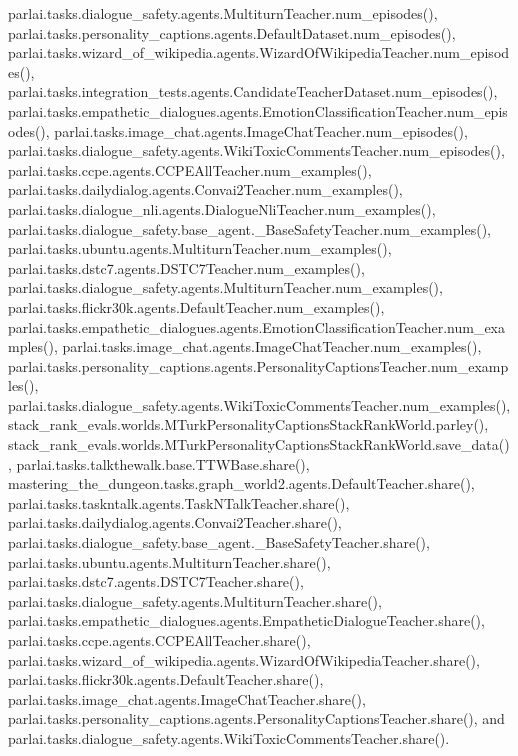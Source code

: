 parlai.\+tasks.\+dialogue\+\_\+safety.\+agents.\+Multiturn\+Teacher.\+num\+\_\+episodes(), parlai.\+tasks.\+personality\+\_\+captions.\+agents.\+Default\+Dataset.\+num\+\_\+episodes(), parlai.\+tasks.\+wizard\+\_\+of\+\_\+wikipedia.\+agents.\+Wizard\+Of\+Wikipedia\+Teacher.\+num\+\_\+episodes(), parlai.\+tasks.\+integration\+\_\+tests.\+agents.\+Candidate\+Teacher\+Dataset.\+num\+\_\+episodes(), parlai.\+tasks.\+empathetic\+\_\+dialogues.\+agents.\+Emotion\+Classification\+Teacher.\+num\+\_\+episodes(), parlai.\+tasks.\+image\+\_\+chat.\+agents.\+Image\+Chat\+Teacher.\+num\+\_\+episodes(), parlai.\+tasks.\+dialogue\+\_\+safety.\+agents.\+Wiki\+Toxic\+Comments\+Teacher.\+num\+\_\+episodes(), parlai.\+tasks.\+ccpe.\+agents.\+C\+C\+P\+E\+All\+Teacher.\+num\+\_\+examples(), parlai.\+tasks.\+dailydialog.\+agents.\+Convai2\+Teacher.\+num\+\_\+examples(), parlai.\+tasks.\+dialogue\+\_\+nli.\+agents.\+Dialogue\+Nli\+Teacher.\+num\+\_\+examples(), parlai.\+tasks.\+dialogue\+\_\+safety.\+base\+\_\+agent.\+\_\+\+Base\+Safety\+Teacher.\+num\+\_\+examples(), parlai.\+tasks.\+ubuntu.\+agents.\+Multiturn\+Teacher.\+num\+\_\+examples(), parlai.\+tasks.\+dstc7.\+agents.\+D\+S\+T\+C7\+Teacher.\+num\+\_\+examples(), parlai.\+tasks.\+dialogue\+\_\+safety.\+agents.\+Multiturn\+Teacher.\+num\+\_\+examples(), parlai.\+tasks.\+flickr30k.\+agents.\+Default\+Teacher.\+num\+\_\+examples(), parlai.\+tasks.\+empathetic\+\_\+dialogues.\+agents.\+Emotion\+Classification\+Teacher.\+num\+\_\+examples(), parlai.\+tasks.\+image\+\_\+chat.\+agents.\+Image\+Chat\+Teacher.\+num\+\_\+examples(), parlai.\+tasks.\+personality\+\_\+captions.\+agents.\+Personality\+Captions\+Teacher.\+num\+\_\+examples(), parlai.\+tasks.\+dialogue\+\_\+safety.\+agents.\+Wiki\+Toxic\+Comments\+Teacher.\+num\+\_\+examples(), stack\+\_\+rank\+\_\+evals.\+worlds.\+M\+Turk\+Personality\+Captions\+Stack\+Rank\+World.\+parley(), stack\+\_\+rank\+\_\+evals.\+worlds.\+M\+Turk\+Personality\+Captions\+Stack\+Rank\+World.\+save\+\_\+data(), parlai.\+tasks.\+talkthewalk.\+base.\+T\+T\+W\+Base.\+share(), mastering\+\_\+the\+\_\+dungeon.\+tasks.\+graph\+\_\+world2.\+agents.\+Default\+Teacher.\+share(), parlai.\+tasks.\+taskntalk.\+agents.\+Task\+N\+Talk\+Teacher.\+share(), parlai.\+tasks.\+dailydialog.\+agents.\+Convai2\+Teacher.\+share(), parlai.\+tasks.\+dialogue\+\_\+safety.\+base\+\_\+agent.\+\_\+\+Base\+Safety\+Teacher.\+share(), parlai.\+tasks.\+ubuntu.\+agents.\+Multiturn\+Teacher.\+share(), parlai.\+tasks.\+dstc7.\+agents.\+D\+S\+T\+C7\+Teacher.\+share(), parlai.\+tasks.\+dialogue\+\_\+safety.\+agents.\+Multiturn\+Teacher.\+share(), parlai.\+tasks.\+empathetic\+\_\+dialogues.\+agents.\+Empathetic\+Dialogue\+Teacher.\+share(), parlai.\+tasks.\+ccpe.\+agents.\+C\+C\+P\+E\+All\+Teacher.\+share(), parlai.\+tasks.\+wizard\+\_\+of\+\_\+wikipedia.\+agents.\+Wizard\+Of\+Wikipedia\+Teacher.\+share(), parlai.\+tasks.\+flickr30k.\+agents.\+Default\+Teacher.\+share(), parlai.\+tasks.\+image\+\_\+chat.\+agents.\+Image\+Chat\+Teacher.\+share(), parlai.\+tasks.\+personality\+\_\+captions.\+agents.\+Personality\+Captions\+Teacher.\+share(), and parlai.\+tasks.\+dialogue\+\_\+safety.\+agents.\+Wiki\+Toxic\+Comments\+Teacher.\+share().

